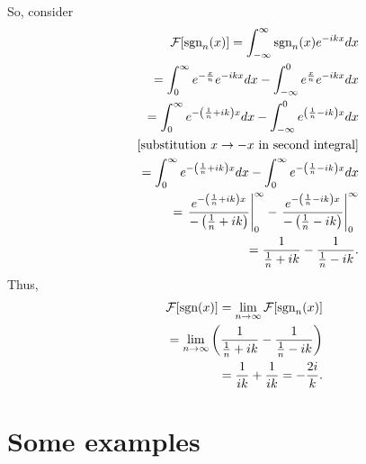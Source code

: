 So, consider
\begin{equation}
\begin{split}
  {\cal F}[\textrm{sgn}_n (x)]= \int_{-\infty}^\infty  \textrm{sgn}_n (x) e^{-i{kx}} dx   \\
\qquad =
\int_{0}^\infty  e^{-\frac{x}{n}} e^{-i{kx}} dx
-
\int_{-\infty}^0  e^{ \frac{x}{n}} e^{-i{kx}} dx
\\
\qquad =
\int_{0}^\infty  e^{-\left(\frac{1}{n}+i{k}\right) x} dx
-
\int_{-\infty}^0  e^{ \left(\frac{1}{n}-i{k}\right) x} dx
\\
\qquad \;
[\textrm{substitution }x \rightarrow -x \textrm{ in second integral}]\\
\qquad =
\int_{0}^\infty  e^{-\left(\frac{1}{n}+i{k}\right) x} dx
-
\int_{0}^\infty  e^{-\left(\frac{1}{n}-i{k}\right) x} dx
\\
\qquad =
\left.  \frac{ e^{-\left(\frac{1}{n}+i{k}\right) x}}{{-\left(\frac{1}{n}+i{k}\right)  }} \right|_{0}^\infty
-
\left.  \frac{ e^{-\left(\frac{1}{n}-i{k}\right) x}}{-\left(\frac{1}{n}-i{k}\right)} \right|_{0}^\infty
\\
\qquad =
  \frac{ 1}{  \frac{1}{n}+i{k} }
-
 \frac{ 1 }{ \frac{1}{n}-i{k} }
.
\end{split}
\label{2011-m-ftsgn1a}
\end{equation}
Thus,
\begin{equation}
\begin{split}
{\cal F}[\textrm{sgn}  (x)] =\lim_{n\rightarrow \infty}  {\cal F}[\textrm{sgn}_n (x)]
\\
\qquad =  \lim_{n\rightarrow \infty}  \left(
  \frac{ 1}{ \frac{1}{n}+i{k}   }
-
 \frac{ 1 }{  \frac{1}{n}-i{k}   }          \right)
\\
\qquad =
  \frac{ 1}{   i{k}  }
+
 \frac{ 1 }{  i{k} }
 =
  -\frac{2i}{ k }
.
\end{split}
\label{2011-m-ftsgn1b}
\end{equation}
\fi





\section{Some examples}

